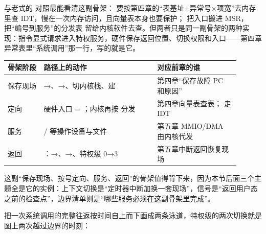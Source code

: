 与老式的  对照最能看清这副骨架： 要按第四章的“表基址+异常号×项宽”去内存里查 IDT，慢在一次内存访问，且向量表本身也要保护； 把入口搬进 MSR，把“编号到服务”的分发表  留给内核软件去查。但两者只是同一副骨架的两种实现：指令显式请求进入特权服务，硬件保存返回位置、切换权限和入口——第四章异常表里“系统调用”那一行，写的就是它。

\begin{longtable}{L{0.14\linewidth}L{0.44\linewidth}L{0.32\linewidth}}
\toprule
骨架阶段 &  路径上的动作 & 对应前章的谁 \\
\midrule
保存现场 & →、→、切内核栈、建  & 第四章“保存故障 PC 和原因” \\
定向 & 硬件入口 = ；内核再按  分发 & 第四章向量表查表； 走 IDT \\
服务 & / 等操作设备与文件 & 第五章 MMIO/DMA 由内核代发 \\
返回 & ：→、→、特权级 0→3 & 第五章中断返回恢复现场 \\
\bottomrule
\end{longtable}

这副“保存现场、按号定向、服务、返回”的骨架值得背下来，因为本节后面三个主题全是它的实例：上下文切换是“定时器中断加换一套现场”，信号是“返回用户态之前的检查点”，边界清单则是“哪些服务必须在这副骨架里完成”。

把一次系统调用的完整往返按时间自上而下画成两条泳道，特权级的两次切换就是图上两次越过边界的时刻：

